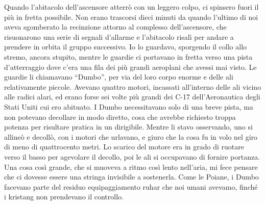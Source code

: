 Quando l'abitacolo dell'ascensore atterrò con un leggero colpo, ci
spinsero fuori il più in fretta possibile. Non erano trascorsi dieci
minuti da quando l'ultimo di noi aveva sgomberato la recinzione attorno
al complesso dell'ascensore, che risuonarono una serie di segnali
d'allarme e l'abitacolo risalì per andare a prendere in orbita il gruppo
successivo. Io lo guardavo, sporgendo il collo allo stremo, ancora
stupito, mentre le guardie ci portavano in fretta verso una pista
d'atterraggio dove c'era una fila dei più grandi aeroplani che avessi
mai visto. Le guardie li chiamavano ``Dumbo'', per via del loro corpo
enorme e delle ali relativamente piccole. Avevano quattro motori,
incassati all'interno delle ali vicino alle radici alari, ed erano forse
sei volte più grandi dei C-17 dell'Aeronautica degli Stati Uniti cui ero
abituato. I Dumbo necessitavano solo di una breve pista, ma non potevano
decollare in modo diretto, cosa che avrebbe richiesto troppa potenza per
risultare pratica in un dirigibile. Mentre li stavo osservando, uno si
allineò e decollò, con i motori che urlavano, e giuro che la cosa fu in
volo nel giro di meno di quattrocento metri. Lo scarico del motore era
in grado di ruotare verso il basso per agevolare il decollo, poi le ali
si occupavano di fornire portanza. Una cosa così grande, che si muoveva
a ritmo così lento nell'aria, mi fece pensare che ci dovesse essere una
stringa invisibile a sostenerla. Come le Poiane, i Dumbo facevano parte
del residuo equipaggiamento ruhar che noi umani avevamo, finché i
kristang non prendevano il controllo.

